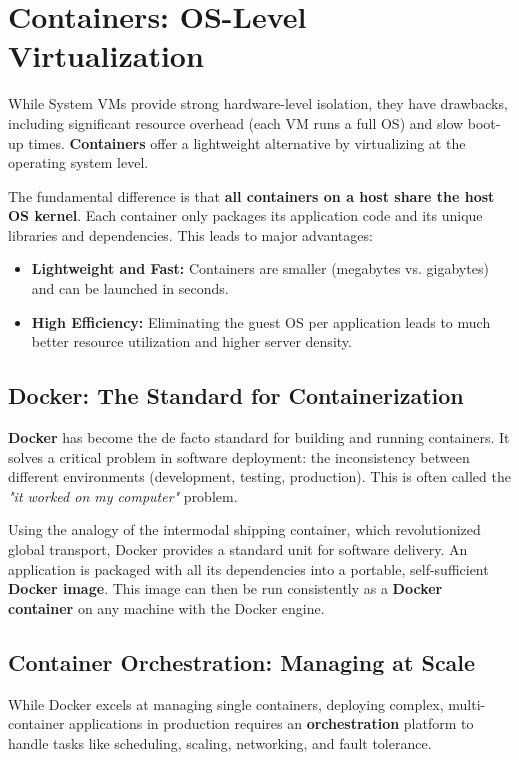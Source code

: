 \section{Containers: OS-Level Virtualization}
While System VMs provide strong hardware-level isolation, they have drawbacks, including significant resource overhead (each VM runs a full OS) and slow boot-up times. \textbf{Containers} offer a lightweight alternative by virtualizing at the operating system level.


The fundamental difference is that \textbf{all containers on a host share the host OS kernel}. Each container only packages its application code and its unique libraries and dependencies. This leads to major advantages:
\begin{itemize}
    \item \textbf{Lightweight and Fast:} Containers are smaller (megabytes vs. gigabytes) and can be launched in seconds.
    \item \textbf{High Efficiency:} Eliminating the guest OS per application leads to much better resource utilization and higher server density.
\end{itemize}

\subsection{Docker: The Standard for Containerization}
\textbf{Docker} has become the de facto standard for building and running containers. It solves a critical problem in software deployment: the inconsistency between different environments (development, testing, production). This is often called the \textit{"it worked on my computer"} problem.

Using the analogy of the intermodal shipping container, which revolutionized global transport, Docker provides a standard unit for software delivery. An application is packaged with all its dependencies into a portable, self-sufficient \textbf{Docker image}. This image can then be run consistently as a \textbf{Docker container} on any machine with the Docker engine.

\subsection{Container Orchestration: Managing at Scale}
While Docker excels at managing single containers, deploying complex, multi-container applications in production requires an \textbf{orchestration} platform to handle tasks like scheduling, scaling, networking, and fault tolerance.

